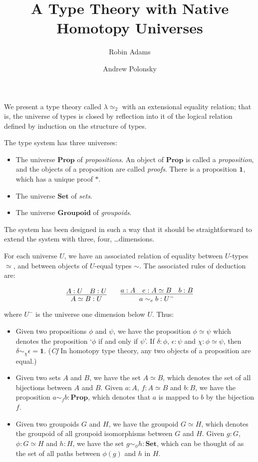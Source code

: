 \documentclass{easychair}
\title{A Type Theory with Native Homotopy Universes}
\author{Robin Adams\inst{1} \and Andrew Polonsky\inst{2}}
\institute{Universitetet i Bergen \and University Paris Diderot}
\newcommand{\Prop}{\ensuremath{\mathbf{Prop}}}
\newcommand{\Set}{\ensuremath{\mathbf{Set}}}
\newcommand{\Groupoid}{\ensuremath{\mathbf{Groupoid}}}
\newcommand{\LEtwo}{\ensuremath{\lambda \! \! \simeq_2}}
\begin{document}
\maketitle

We present a type theory called $\LEtwo$ with an extensional equality relation; that is, the universe of types is closed by reflection into it of the logical relation defined by induction on the structure of types.

The type system has three universes:
\begin{itemize}
\item
The universe $\Prop$ of \emph{propositions}.  An object of $\Prop$ is
called a \emph{proposition}, and the objects of a proposition are
called \emph{proofs}.  There is a proposition $\mathbf{1}$, which has
a unique proof $*$.
\item
The universe $\Set$ of \emph{sets}.
\item
The universe $\Groupoid$ of \emph{groupoids}.
\end{itemize}
The system has been designed in such a way that it should be straightforward to extend the system with three, four, \ldots dimensions.

For each universe $U$, we have an associated relation of equality
between $U$-types $\simeq$, and between objects of $U$-equal
types $\sim$.  The associated rules of deduction are:

\[ \infer{A \simeq B : U}{A : U \quad B : U}
\qquad
\infer{a \sim_e b : U^-}{a : A \quad e : A \simeq B \quad b : B} \]

where $U^-$ is the universe one dimension below $U$.  Thus:
\begin{itemize}
\item
Given two propositions $\phi$ and $\psi$, we have the proposition $\phi \simeq \psi$ which denotes the proposition `$\phi$ if and only if $\psi$'.  If $\delta : \phi$, $\epsilon : \psi$ and $\chi : \phi \simeq \psi$, then $\delta \sim_\chi \epsilon = \mathbf{1}$.  (\emph{Cf} In homotopy type theory, any two objects of a proposition are equal.)
\item
Given two sets $A$ and $B$, we have the set $A \simeq B$, which denotes the set of all bijections between $A$ and $B$.  Given $a : A$, $f : A \simeq B$ and $b : B$, we have the proposition $a \sim_f b : \Prop$, which denotes that $a$ is mapped to $b$ by the bijection $f$.
\item
Given two groupoids $G$ and $H$, we have the groupoid $G \simeq H$, which denotes the groupoid of all groupoid isomorphisms between $G$ and $H$.  Given $g : G$, $\phi : G \simeq H$ and $h : H$, we have the set $g \sim_\phi h : \Set$, which can be thought of as the set of all paths between $\phi(g)$ and $h$ in $H$.
\end{itemize}
\end{document}
